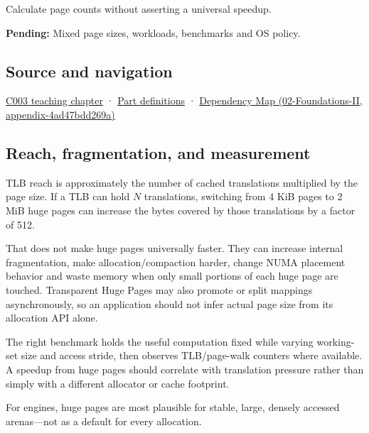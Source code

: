Calculate page counts without asserting a universal speedup.

\textbf{Pending:} Mixed page sizes, workloads, benchmarks and OS policy.

\subsection{Source and navigation}\label{source-and-navigation}

\href{Continuous\%20Notes/Computing\%20Foundations\%20-\%20From\%20Bits\%20to\%20C++\%20and\%20Systems\%20APIs\#Where\%20the\%20bytes\%20live}{C003 teaching chapter} · \hyperref[appendix-fd090d982a15]{Part definitions} · \href{}{Dependency Map (02-Foundations-II, appendix-4ad47bdd269a)}

\subsection{Reach, fragmentation, and measurement}\label{reach-fragmentation-and-measurement}

TLB reach is approximately the number of cached translations multiplied by the page size. If a TLB can hold \(N\) translations, switching from 4 KiB pages to 2 MiB huge pages can increase the bytes covered by those translations by a factor of 512.

That does not make huge pages universally faster. They can increase internal fragmentation, make allocation/compaction harder, change NUMA placement behavior and waste memory when only small portions of each huge page are touched. Transparent Huge Pages may also promote or split mappings asynchronously, so an application should not infer actual page size from its allocation API alone.

The right benchmark holds the useful computation fixed while varying working-set size and access stride, then observes TLB/page-walk counters where available. A speedup from huge pages should correlate with translation pressure rather than simply with a different allocator or cache footprint.

For engines, huge pages are most plausible for stable, large, densely accessed arenas---not as a default for every allocation.
